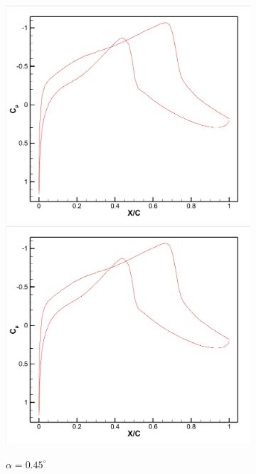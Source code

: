 \begin{figure}[H]
\centering
\begin{subfigure}[b]{0.45\textwidth}
\centering
\includegraphics[width=0.9\linewidth]{0.45真实值.png} \\
\includegraphics[width=0.9\linewidth]{0.45插值.png}
\caption{\songti$\alpha=0.45^\circ$}
\label{fig:alpha0.45}
\end{subfigure}
\hfill
\begin{subfigure}[b]{0.45\textwidth}
\centering

\end{subfigure}
\end{figure}
